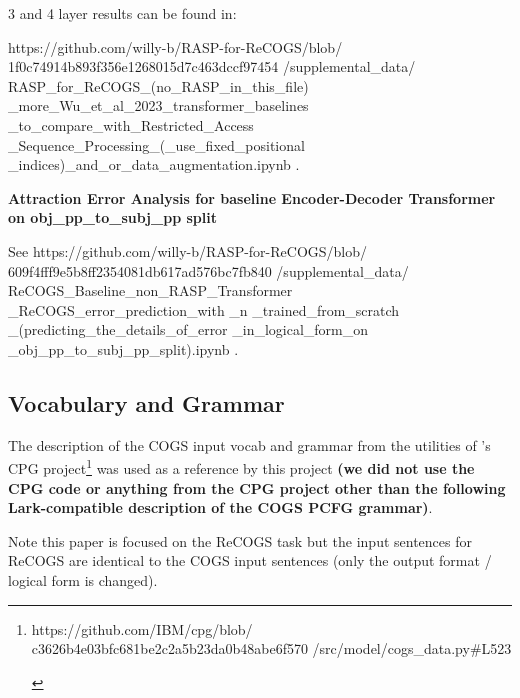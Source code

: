 \documentclass[11pt]{article}
\begin{document}
3 and 4 layer results can be found in:

https://github.com/willy-b/RASP-for-ReCOGS/blob/
1f0c74914b893f356e1268015d7c463dccf97454
/supplemental\_data/
RASP\_for\_ReCOGS\_(no\_RASP\_in\_this\_file)
\_more\_Wu\_et\_al\_2023\_transformer\_baselines
\_to\_compare\_with\_Restricted\_Access
\_Sequence\_Processing\_(\_use\_fixed\_positional
\_indices)\_and\_or\_data\_augmentation.ipynb .

\textbf{Attraction Error Analysis for \cite{Wu2023} baseline Encoder-Decoder Transformer on obj\_pp\_to\_subj\_pp split}

See https://github.com/willy-b/RASP-for-ReCOGS/blob/
609f4fff9e5b8ff2354081db617ad576bc7fb840
/supplemental\_data/
ReCOGS\_Baseline\_non\_RASP\_Transformer
\_ReCOGS\_error\_prediction\_with
\_n%
\_trained\_from\_scratch
\_(predicting\_the\_details\_of\_error
\_in\_logical\_form\_on
\_obj\_pp\_to\_subj\_pp\_split).ipynb .

\clearpage

\subsection{Vocabulary and Grammar}
\label{vocabulary_and_grammar}

The description of the COGS \cite{KimLinzen2020} input vocab and grammar from the utilities of \cite{klinger2024compositionalprogramgenerationfewshot}'s CPG project\footnote{\begin{footnotesize}https://github.com/IBM/cpg/blob/
c3626b4e03bfc681be2c2a5b23da0b48abe6f570
/src/model/cogs\_data.py\#L523 
\end{footnotesize}
} was used as a reference by this project \textbf{(we did not use the CPG code or anything from the CPG project other than the following Lark-compatible description of the COGS PCFG grammar)}.

Note this paper is focused on the ReCOGS task but the input sentences for ReCOGS are identical to the COGS input sentences (only the output format / logical form is changed).
\end{document}
